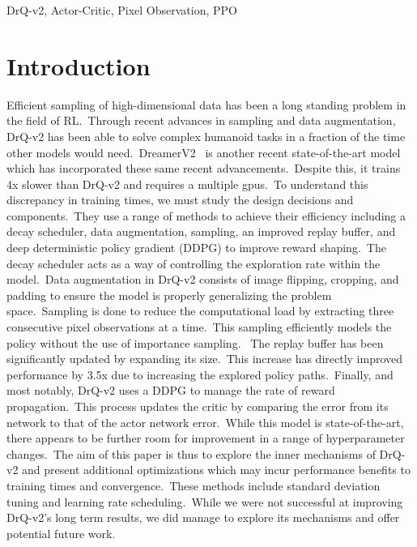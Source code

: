 \documentclass[conference]{./IEEEtran/IEEEtran} %
\begin{document}
    \begin{IEEEkeywords}
        DrQ-v2, Actor-Critic, Pixel Observation, PPO
    \end{IEEEkeywords}

    \section{Introduction}\label{sec:introduction}



    Efficient sampling of high-dimensional data has been a long standing problem in the field of RL.\ Through recent advances in
    sampling and data augmentation, DrQ-v2 has been able to solve complex humanoid tasks in a fraction of the time other models
    would need.\ DreamerV2~\cite{DreamerV2} is another recent state-of-the-art model which has incorporated these same recent advancements.\
    Despite this, it trains 4x slower than DrQ-v2 and requires a multiple gpus.\ To understand this discrepancy in training
    times, we must study the design decisions and components.\ They use a range of methods to achieve their efficiency including
    a decay scheduler, data augmentation, sampling, an improved replay buffer, and deep deterministic policy gradient (DDPG) to
    improve reward shaping.\
    The decay scheduler acts as a way of controlling the exploration rate within the model.\ Data augmentation in DrQ-v2 consists
    of image flipping, cropping, and padding to ensure the model is properly generalizing the problem space.\ Sampling is done
    to reduce the computational load by extracting three consecutive pixel observations at a time.\ This sampling efficiently
    models the policy without the use of importance sampling. \ The replay buffer has been significantly updated by expanding its
    size.\ This increase has directly improved performance by 3.5x due to increasing the explored policy paths.\ Finally, and most
    notably, DrQ-v2 uses a DDPG to manage the rate of reward propagation.\ This process updates the critic by comparing the error
    from its network to that of the actor network error.\
    While this model is state-of-the-art, there appears to be further room for improvement in a range of hyperparameter changes.\
    The aim of this paper is thus to explore the inner mechanisms of DrQ-v2 and present additional optimizations which may incur
    performance benefits to training times and convergence.\ These methods include standard deviation tuning and
    learning rate scheduling.\ While we were not successful at improving DrQ-v2's long term results, we did manage to explore
    its mechanisms and offer potential future work.
\end{document}
